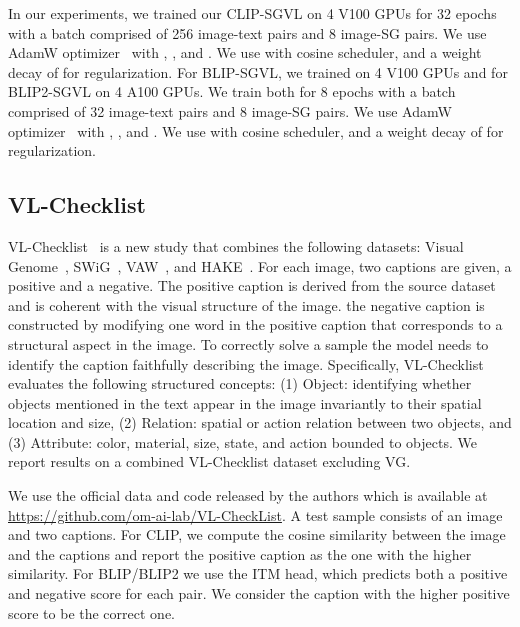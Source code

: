 \documentclass[11pt]{article}
\newcommand{\minisection}[1]{\noindent{\textbf{#1}.}}
\begin{document}
In our experiments, we trained our CLIP-SGVL on 4 V100 GPUs for 32 epochs with a batch comprised of 256 image-text pairs and 8 image-SG pairs. We use AdamW optimizer~\cite{kingma2014adam,Loshchilov2017AdamW} with , , and . We use  with cosine scheduler, and a weight decay of  for regularization. For BLIP-SGVL, we trained on 4 V100 GPUs and for BLIP2-SGVL on 4 A100 GPUs. We train both for 8 epochs with a batch comprised of 32 image-text pairs and 8 image-SG pairs. We use AdamW optimizer~\cite{kingma2014adam} with , , and . We use  with cosine scheduler, and a weight decay of  for regularization. 





\subsection{VL-Checklist}
\minisection{Dataset} VL-Checklist~\cite{vlc} is a new study that combines the following datasets: Visual Genome~\cite{krishna2017visual}, SWiG~\cite{swig}, VAW~\cite{vaw}, and HAKE~\cite{hake}. For each image, two captions are given, a positive and a negative. The positive caption is derived from the source dataset and is coherent with the visual structure of the image. the negative caption is constructed by modifying one word in the positive caption that corresponds to a structural aspect in the image. To correctly solve a sample the model needs to identify the caption faithfully describing the image. Specifically, VL-Checklist evaluates the following structured concepts: (1) Object: identifying whether objects mentioned in the text appear in the image invariantly to their spatial location and size, (2) Relation: spatial or action relation between two objects, and (3) Attribute: color, material, size, state, and action bounded to objects. We report results on a combined VL-Checklist dataset excluding VG.
\label{supp:impl:vl}








\minisection{Inference details} We use the official data and code released by the authors which is available at \url{https://github.com/om-ai-lab/VL-CheckList}.  A test sample consists of an image and two captions. For CLIP, we compute the cosine similarity between the image and the captions and report the positive caption as the one with the higher similarity. For BLIP/BLIP2 we use the ITM head, which predicts both a positive and negative score for each pair. We consider the caption with the higher positive score to be the correct one.
\end{document}
